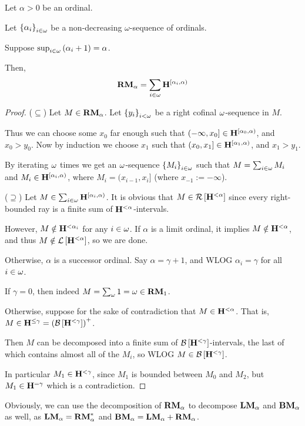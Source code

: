 \begin{lemma}\label{rmj-decomposition}
  Let $\alpha > 0$ be an ordinal.

  Let $\left\{ {\alpha_i} \right\}_{i \in \omega}$ be a non-decreasing $\omega$-sequence of ordinals.

  Suppose $\sup_{i \in \omega} \left( {\alpha_i + 1} \right) = \alpha$.

  Then,
  \[
    \mathbf{RM}_{\alpha} = \sum_{i \in \omega}{\mathbf{H}^{[\alpha_i, \alpha)}}
  \]
\end{lemma}

\begin{proof}
  ($\subseteq$) Let $M \in \mathbf{RM}_{\alpha}$.
  Let $\left\{ {y_i} \right\}_{i < \omega}$ be a right cofinal $\omega$-sequence in $M$.

  Thus we can choose some $x_0$ far enough such that $(-\infty, x_0] \in \mathbf{H}^{[\alpha_0, \alpha)}$,
          and $x_0 > y_0$.
          Now by induction we choose $x_1$ such that $(x_0, x_1] \in \mathbf{H}^{[\alpha_1, \alpha)}$,
  and $x_1 > y_1$.

  By iterating $\omega$ times we get an $\omega$-sequence $\left\{ {M_i} \right\}_{i \in \omega}$
  such that $M = \sum_{i \in \omega} M_i$ and $M_i \in \mathbf{H}^{[\alpha_i, \alpha)}$,
          where $M_i = (x_{i-1}, x_i]$ (where $x_{-1} := -\infty$).


  ($\supseteq$) Let $M \in \sum_{i \in \omega}{\mathbf{H}^{[\alpha_i, \alpha)}}$.
  It is obvious that $M \in \mathcal{R} \left[ {\mathbf{H}^{< \alpha}} \right]$ since every right-bounded
  ray is a finite sum of $\mathbf{H}^{< \alpha}$-intervals.

  However, $M \notin \mathbf{H}^{< \alpha_i}$ for any $i \in \omega$.
  If $\alpha$ is a limit ordinal, it implies $M \notin \mathbf{H}^{< \alpha}$,
  and thus $M \notin \mathcal{L} \left[ {\mathbf{H}^{< \alpha}} \right]$, so we are done.

  Otherwise, $\alpha$ is a successor ordinal. Say $\alpha = \gamma + 1$,
  and WLOG $\alpha_i = \gamma$ for all $i \in \omega$.

  If $\gamma = 0$,
  then indeed $M = \sum_{\omega}{1} = \omega \in \mathbf{RM}_{1}$.

  Otherwise, suppose for the sake of contradiction that $M \in \mathbf{H}^{< \alpha}$.
  That is, $M \in \mathbf{H}^{\le \gamma} = \left( {\mathcal{B} \left[ {\mathbf{H}^{< \gamma}} \right]} \right)^+$.

  Then $M$ can be decomposed into a finite sum of $\mathcal{B} \left[ {\mathbf{H}^{< \gamma}} \right]$-intervals, the last of which contains almost all of the $M_i$,
  so WLOG $M \in \mathcal{B} \left[ {\mathbf{H}^{< \gamma}} \right]$.

  In particular $M_1 \in \mathbf{H}^{< \gamma}$, since $M_1$ is bounded between
  $M_0$ and $M_2$, but $M_1 \in \mathbf{H}^{= \gamma}$ which is a contradiction.
\end{proof}

Obviously, we can use the decomposition of $\mathbf{RM}_{\alpha}$ to decompose
$\mathbf{LM}_{\alpha}$ and $\mathbf{BM}_{\alpha}$ as well,
as $\mathbf{LM}_{\alpha} = \mathbf{RM}_{\alpha}^\ast$ and $\mathbf{BM}_{\alpha} = \mathbf{LM}_{\alpha} + \mathbf{RM}_{\alpha}$.